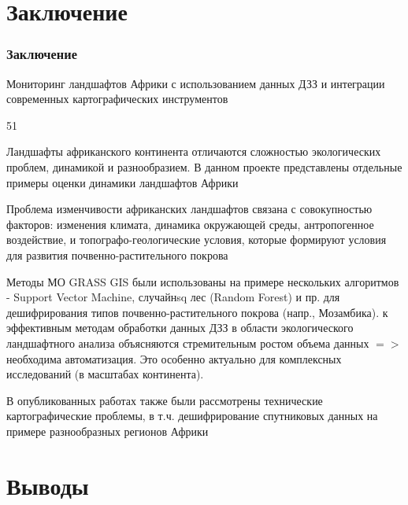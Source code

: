 \documentclass[pdflatex,compress,8pt,
	xcolor={dvipsnames,dvipsnames,svgnames,x11names,table},
	hyperref={colorlinks = true, breaklinks = true, urlcolor = NavyBlue, linkcolor=white, breaklinks = true}]{beamer}
\begin{document}
\section{Заключение}

\begin{frame}\frametitle{Заключение}
\begin{alertblock}{Мониторинг ландшафтов Африки с использованием данных ДЗЗ и интеграции современных картографических инструментов}
\begin{dinglist}{51}\small
      \item Ландшафты африканского континента отличаются сложностью экологических проблем, динамикой и разнообразием. В данном проекте представлены отдельные примеры оценки динамики ландшафтов Африки
 \item Проблема изменчивости африканских ландшафтов связана с совокупностью факторов: изменения климата, динамика окружающей среды, антропогенное воздействие, и топографо-геологические условия, которые формируют условия для развития почвенно-растительного покрова
	\item Методы МО GRASS GIS были использованы на примере нескольких алгоритмов - Support Vector Machine, случайнsq лес (Random Forest) и пр. для дешифрирования типов почвенно-растительного покрова (напр., Мозамбика).
 к эффективным методам обработки данных ДЗЗ в области экологического ландшафтного анализа объясняются стремительным ростом объема данных $=>$ необходима автоматизация. Это особенно актуально для комплексных исследований (в масштабах континента).
\item В опубликованных работах также были рассмотрены технические картографические проблемы, в т.ч. дешифрирование спутниковых данных на примере разнообразных регионов Африки
 \end{dinglist} 
 \end{alertblock}
\end{frame}

\section{Выводы}
\end{document}
